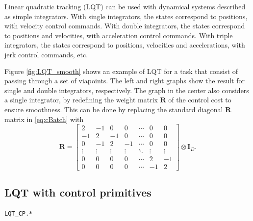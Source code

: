 \documentclass[10pt,a4paper]{article} %
\newcommand{\filename}[1]{\colorbox{rr2}{\color{white}\texttt{#1}}}
\begin{document}
Linear quadratic tracking (LQT) can be used with dynamical systems described as simple integrators. With single integrators, the states correspond to positions, with velocity control commands. With double integrators, the states correspond to positions and velocities, with acceleration control commands. With triple integrators, the states correspond to positions, velocities and accelerations, with jerk control commands, etc.

Figure \ref{fig:LQT_smooth} shows an example of LQT for a task that consist of passing through a set of viapoints. The left and right graphs show the result for single and double integrators, respectively. The graph in the center also considers a single integrator, by redefining the weight matrix $\bm{R}$ of the control cost to ensure smoothness. This can be done by replacing the standard diagonal $\bm{R}$ matrix in \eqref{eq:cBatch} with
\begin{equation*}
	\bm{R} = \left[\begin{matrix}
	 2 & -1 &  0 &  0 & \cdots & 0 & 0 \\
	-1 &  2 & -1 &  0 & \cdots & 0 & 0 \\
	 0 & -1 &  2 & -1 & \cdots & 0 & 0 \\
	\vdots & \vdots & \vdots & \vdots & \ddots & \vdots & \vdots \\
	 0 &  0 &  0 &  0 & \cdots &  2 & -1 \\
	 0 &  0 &  0 &  0 & \cdots & -1 &  2 
	\end{matrix}\right] 
	\otimes \bm{I}_D.
\end{equation*}
\newline

\newpage
\subsection{LQT with control primitives}
\begin{flushright}
\filename{LQT\_CP.*}
\end{flushright}
\end{document}
